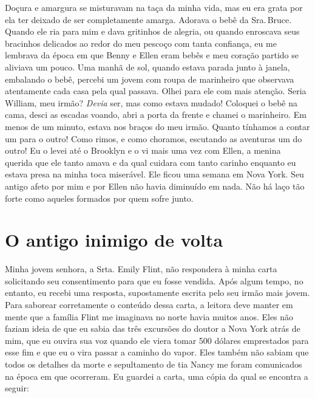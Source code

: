 Doçura e amargura se misturavam na taça
da minha vida, mas eu era grata por ela ter deixado de ser completamente
amarga. Adorava o bebê da Sra.\,Bruce. Quando ele ria para mim e dava
gritinhos de alegria, ou quando enroscava seus bracinhos delicados ao
redor do meu pescoço com tanta confiança, eu me lembrava da época em que
Benny e Ellen eram bebês e meu coração partido se aliviava um pouco. Uma
manhã de sol, quando estava parada junto à janela, embalando o bebê,
percebi um jovem com roupa de marinheiro que observava atentamente cada
casa pela qual passava. Olhei para ele com mais atenção. Seria William,
meu irmão? \emph{Devia} ser, mas como estava mudado! Coloquei o bebê na
cama, desci as escadas voando, abri a porta da frente e chamei o
marinheiro. Em menos de um minuto, estava nos braços do meu irmão.
Quanto tínhamos a contar um para o outro! Como rimos, e como choramos,
escutando as aventuras um do outro! Eu o levei até o Brooklyn e o vi
mais uma vez com Ellen, a menina querida que ele tanto amava e da qual
cuidara com tanto carinho enquanto eu estava presa na minha toca
miserável. Ele ficou uma semana em Nova York. Seu antigo afeto por mim e
por Ellen não havia diminuído em nada. Não há laço tão forte como
aqueles formados por quem sofre junto.

\chapter*{O antigo inimigo de volta}

Minha jovem senhora, a Srta. Emily
Flint, não respondera à minha carta solicitando seu consentimento para
que eu fosse vendida. Após algum tempo, no entanto, eu recebi uma
resposta, supostamente escrita pelo seu irmão mais jovem. Para saborear
corretamente o conteúdo dessa carta, a leitora deve manter em mente que
a família Flint me imaginava no norte havia muitos anos. Eles não faziam
ideia de que eu sabia das três excursões do doutor a Nova York atrás de
mim, que eu ouvira sua voz quando ele viera tomar 500 dólares
emprestados para esse fim e que eu o vira passar a caminho do vapor.
Eles também não sabiam que todos os detalhes da morte e sepultamento de
tia Nancy me foram comunicados na época em que ocorreram. Eu guardei a
carta, uma cópia da qual se encontra a seguir:

